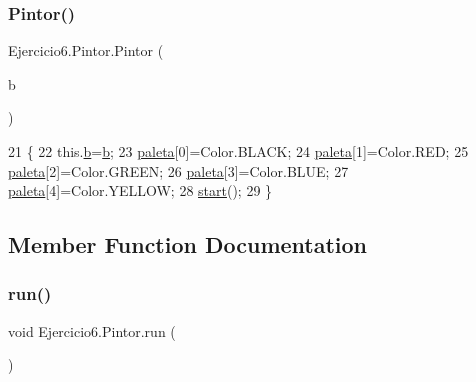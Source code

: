 \subsubsection{\texorpdfstring{Pintor()}{Pintor()}}
{\footnotesize\ttfamily Ejercicio6.\+Pintor.\+Pintor (\begin{DoxyParamCaption}\item[{J\+Button}]{b }\end{DoxyParamCaption})\hspace{0.3cm}{\ttfamily [inline]}}


\begin{DoxyCode}
21                             \{
22         this.\mbox{\hyperlink{class_ejercicio6_1_1_pintor_aec7eeb4a5b66d768545833f994d68960}{b}}=\mbox{\hyperlink{class_ejercicio6_1_1_pintor_aec7eeb4a5b66d768545833f994d68960}{b}};
23         \mbox{\hyperlink{class_ejercicio6_1_1_pintor_aba0f36a5798f20695b1fa58540c2129e}{paleta}}[0]=Color.BLACK;
24         \mbox{\hyperlink{class_ejercicio6_1_1_pintor_aba0f36a5798f20695b1fa58540c2129e}{paleta}}[1]=Color.RED;
25         \mbox{\hyperlink{class_ejercicio6_1_1_pintor_aba0f36a5798f20695b1fa58540c2129e}{paleta}}[2]=Color.GREEN;
26         \mbox{\hyperlink{class_ejercicio6_1_1_pintor_aba0f36a5798f20695b1fa58540c2129e}{paleta}}[3]=Color.BLUE;
27         \mbox{\hyperlink{class_ejercicio6_1_1_pintor_aba0f36a5798f20695b1fa58540c2129e}{paleta}}[4]=Color.YELLOW;
28         \mbox{\hyperlink{namespaceejemplo_1_1clase_abcf43191f0ecf3b071ca2db7696ba821}{start}}();
29     \}
\end{DoxyCode}


\subsection{Member Function Documentation}
\mbox{\label{class_ejercicio6_1_1_pintor_ab900b0e9aaeb5bf3ae8a013381cb63ba}} 
\subsubsection{\texorpdfstring{run()}{run()}}
{\footnotesize\ttfamily void Ejercicio6.\+Pintor.\+run (\begin{DoxyParamCaption}{ }\end{DoxyParamCaption})\hspace{0.3cm}{\ttfamily [inline]}}


